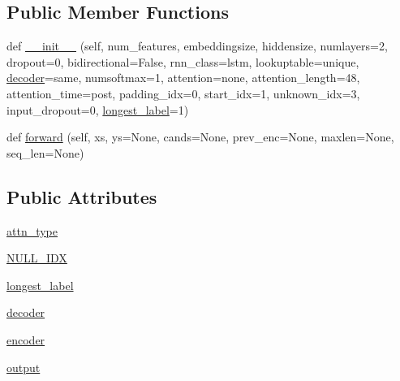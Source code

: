 \subsection*{Public Member Functions}
\begin{DoxyCompactItemize}
\item 
def \hyperlink{classparlai_1_1agents_1_1legacy__agents_1_1seq2seq_1_1modules__v1_1_1Seq2seq_abfe3c5c84e59f3a9d2fb2a319e422be2}{\+\_\+\+\_\+init\+\_\+\+\_\+} (self, num\+\_\+features, embeddingsize, hiddensize, numlayers=2, dropout=0, bidirectional=False, rnn\+\_\+class=\textquotesingle{}lstm\textquotesingle{}, lookuptable=\textquotesingle{}unique\textquotesingle{}, \hyperlink{classparlai_1_1agents_1_1legacy__agents_1_1seq2seq_1_1modules__v1_1_1Seq2seq_ae9b0eb816ded5bba7a70ceac84660d9e}{decoder}=\textquotesingle{}same\textquotesingle{}, numsoftmax=1, attention=\textquotesingle{}none\textquotesingle{}, attention\+\_\+length=48, attention\+\_\+time=\textquotesingle{}post\textquotesingle{}, padding\+\_\+idx=0, start\+\_\+idx=1, unknown\+\_\+idx=3, input\+\_\+dropout=0, \hyperlink{classparlai_1_1agents_1_1legacy__agents_1_1seq2seq_1_1modules__v1_1_1Seq2seq_a9f57138d3d8d37b267bfcd2c32671da5}{longest\+\_\+label}=1)
\item 
def \hyperlink{classparlai_1_1agents_1_1legacy__agents_1_1seq2seq_1_1modules__v1_1_1Seq2seq_a59af567499dfa8e60ccc185391143d41}{forward} (self, xs, ys=None, cands=None, prev\+\_\+enc=None, maxlen=None, seq\+\_\+len=None)
\end{DoxyCompactItemize}
\subsection*{Public Attributes}
\begin{DoxyCompactItemize}
\item 
\hyperlink{classparlai_1_1agents_1_1legacy__agents_1_1seq2seq_1_1modules__v1_1_1Seq2seq_ae2751bbf922e0897d10d904340f62a1c}{attn\+\_\+type}
\item 
\hyperlink{classparlai_1_1agents_1_1legacy__agents_1_1seq2seq_1_1modules__v1_1_1Seq2seq_a9ad469ca9f8901acf6acfd96c0b78cfe}{N\+U\+L\+L\+\_\+\+I\+DX}
\item 
\hyperlink{classparlai_1_1agents_1_1legacy__agents_1_1seq2seq_1_1modules__v1_1_1Seq2seq_a9f57138d3d8d37b267bfcd2c32671da5}{longest\+\_\+label}
\item 
\hyperlink{classparlai_1_1agents_1_1legacy__agents_1_1seq2seq_1_1modules__v1_1_1Seq2seq_ae9b0eb816ded5bba7a70ceac84660d9e}{decoder}
\item 
\hyperlink{classparlai_1_1agents_1_1legacy__agents_1_1seq2seq_1_1modules__v1_1_1Seq2seq_a211aeeea111558aa044329e215450053}{encoder}
\item 
\hyperlink{classparlai_1_1agents_1_1legacy__agents_1_1seq2seq_1_1modules__v1_1_1Seq2seq_a7364360547d5fc82bb4d93a0f52d129e}{output}
\end{DoxyCompactItemize}
